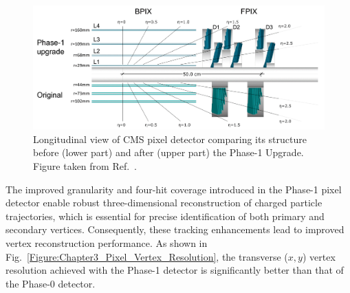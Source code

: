 \begin{figure}[!htbp]
\centering
\includegraphics[width=1\textwidth]{Figures/Chapter3/CMS_Pixel_Upgrade.pdf}
\caption[Longitudinal view of CMS pixel detector before and after Phase-1 Upgrade]{Longitudinal view of \ac{CMS} pixel detector comparing its structure before (lower part) and after (upper part) the Phase-1 Upgrade. Figure taken from Ref.~\cite{CMS_Detector_Run3}.}
\label{Figure:Chapter3_Pixel_Upgrade}
\end{figure}

The improved granularity and four-hit coverage introduced in the Phase-1 pixel detector enable robust three-dimensional reconstruction of charged particle trajectories, which is essential for precise identification of both primary and secondary vertices. Consequently, these tracking enhancements lead to improved vertex reconstruction performance. As shown in Fig.~\ref{Figure:Chapter3_Pixel_Vertex_Resolution}, the transverse ($x,y$) vertex resolution achieved with the Phase-1 detector is significantly better than that of the Phase-0 detector.

